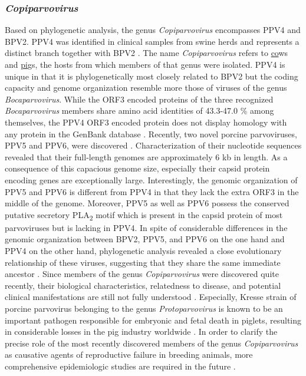 \subsubsection{\textit{Copiparvovirus}}
Based on phylogenetic analysis, the genus \textit{Copiparvovirus} encompasses PPV4 and BPV2. PPV4 was identified in clinical samples from swine herds \cite{pmid20339886, pmid21092136, pmid22967311} and represents a distinct branch together with BPV2 \cite{pmid11562506}. The name \textit{Copiparvovirus} refers to \underline{co}ws and \underline{pi}gs, the hosts from which members of that genus were isolated. PPV4 is unique in that it is phylogenetically most closely related to BPV2 but the coding capacity and genome organization resemble more those of viruses of the genus \textit{Bocaparvovirus}. While the ORF3 encoded proteins of the three recognized \textit{Bocaparvovirus} members share amino acid identities of 43.3-47.0 \% among themselves, the PPV4 ORF3 encoded protein does not display homology with any protein in the GenBank database \cite{pmid20339886, pmid21092136}. 
Recently, two novel porcine parvoviruses, PPV5 and PPV6, were discovered \cite{pmid23405295, pmid25442288}. Characterization of their nucleotide sequences revealed that their full-length genomes are approximately 6 kb in length. As a consequence of this capacious genome size, especially their capsid protein encoding genes are exceptionally large. Interestingly, the genomic organization of PPV5 and PPV6 is different from PPV4 in that they lack the extra ORF3 in the middle of the genome. Moreover, PPV5 as well as PPV6 possess the conserved putative secretory PLA\textsubscript{2} motif which is present in the capsid protein of most parvoviruses but is lacking in PPV4. In spite of considerable differences in the genomic organization between BPV2, PPV5, and PPV6 on the one hand and PPV4 on the other hand, phylogenetic analysis revealed a close evolutionary relationship of these viruses, suggesting that they share the same immediate ancestor \cite{pmid23762339, pmid25442288}.      
Since members of the genus \textit{Copiparvovirus} were discovered quite recently, their biological characteristics, relatedness to disease, and potential clinical manifestations are still not fully understood \cite{pmid20339886, pmid21092136, pmid23762339, pmid25442288}. Especially, Kresse strain of porcine parvovirus belonging to the genus \textit{Protoparvovirus} is known to be an important pathogen responsible for embryonic and fetal death in piglets, resulting in considerable losses in the pig industry worldwide \cite{pmid6314634, pmid427636, pmid999067, pmid3006323}. In order to clarify the precise role of the most recently discovered members of the genus \textit{Copiparvovirus} as causative agents of reproductive failure in breeding animals, more comprehensive epidemiologic studies are required in the future \cite{pmid25442288}. 



